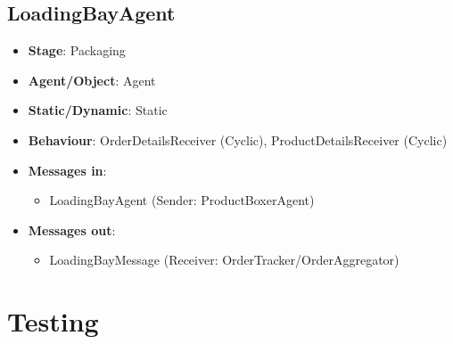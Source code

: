 \documentclass[12pt]{article}
\begin{document}
\newpage{}

\subsection{LoadingBayAgent}
\begin{itemize}
    \item \textbf{Stage}: Packaging
    \item \textbf{Agent/Object}: Agent
    \item \textbf{Static/Dynamic}: Static
    \item \textbf{Behaviour}: OrderDetailsReceiver (Cyclic), ProductDetailsReceiver (Cyclic)
    \item \textbf{Messages in}:
        \begin{itemize}
            \item LoadingBayAgent (Sender: ProductBoxerAgent)
        \end{itemize}
    \item \textbf{Messages out}:
        \begin{itemize}
            \item LoadingBayMessage (Receiver: OrderTracker/OrderAggregator)
        \end{itemize}
\end{itemize}

\section{Testing}





\end{document}
